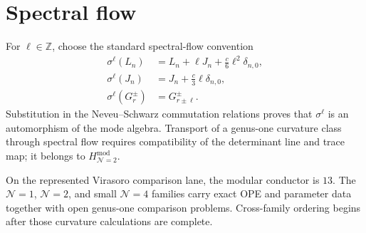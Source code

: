 \section{Spectral flow}
\label{sec:n2-spectral-flow}

For $\ell\in\mathbb Z$, choose the standard spectral-flow convention
\begin{equation}\label{eq:n2-spectral-flow}
\begin{aligned}
 \sigma^\ell(L_n)&=L_n+\ell J_n+\frac{c}{6}\ell^2\delta_{n,0},\\
 \sigma^\ell(J_n)&=J_n+\frac{c}{3}\ell\delta_{n,0},\\
 \sigma^\ell(G_r^\pm)&=G_{r\pm\ell}^\pm.
\end{aligned}
\end{equation}
Substitution in the Neveu--Schwarz commutation relations proves that
$\sigma^\ell$ is an automorphism of the mode algebra.  Transport of a
genus-one curvature class through spectral flow requires compatibility
of the determinant line and trace map; it belongs to
$H_{\mathcal N=2}^{\mathrm{mod}}$.

\begin{remark}
\label{rem:n2-susy-hierarchy}
On the represented Virasoro comparison lane, the modular conductor is
$13$.  The
$\mathcal N=1$, $\mathcal N=2$, and small $\mathcal N=4$ families
carry exact OPE and parameter data together with open genus-one
comparison problems.  Cross-family ordering begins after those
curvature calculations are complete.
\end{remark}
